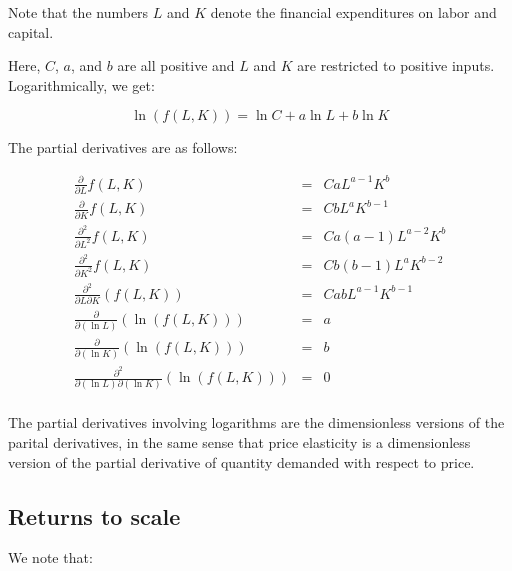 \documentclass[10pt]{amsart}
\begin{document}
Note that the numbers $L$ and $K$ denote the financial expenditures on
labor and capital.

Here, $C$, $a$, and $b$ are all positive and $L$ and $K$ are
restricted to positive inputs. Logarithmically, we get:

$$\ln(f(L,K)) = \ln C + a\ln L + b \ln K$$

The partial derivatives are as follows:

\begin{eqnarray*}
  \frac{\partial}{\partial L}f(L,K) & = & CaL^{a-1}K^b\\
  \frac{\partial}{\partial K}f(L,K) & = & CbL^aK^{b-1}\\
  \frac{\partial^2}{\partial L^2}f(L,K) & = & Ca(a - 1)L^{a-2}K^b\\
  \frac{\partial^2}{\partial K^2}f(L,K) & = & Cb(b - 1)L^aK^{b-2}\\
  \frac{\partial^2}{\partial L \partial K}(f(L,K)) & = & CabL^{a-1}K^{b-1}\\
  \frac{\partial}{\partial (\ln L)}(\ln(f(L,K))) & = & a \\
  \frac{\partial}{\partial (\ln K)}(\ln(f(L,K))) & = & b \\
  \frac{\partial^2}{\partial (\ln L) \partial (\ln K)}(\ln(f(L,K))) & = & 0 \\
\end{eqnarray*}

The partial derivatives involving logarithms are the dimensionless
versions of the parital derivatives, in the same sense that price
elasticity is a dimensionless version of the partial derivative of
quantity demanded with respect to price.

\subsection{Returns to scale}

We note that:
\end{document}
